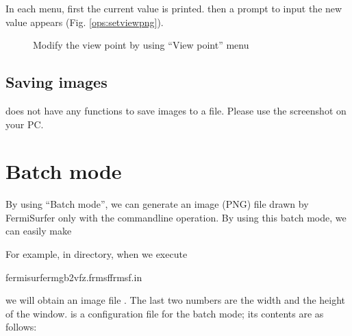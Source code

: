 \documentclass[letterpaper,10pt,pdftex,openany,english]{sphinxmanual}
\let\sphinxpxdimen\pdfpxdimen\else\newdimen\sphinxpxdimen
\begin{document}
\sphinxAtStartPar
In each menu, first the current value is printed. then a prompt to input
the new value appears (Fig. \ref{ops:setviewpng}).

\begin{figure}[htbp]
\centering
\capstart

\noindent\sphinxincludegraphics[width=300\sphinxpxdimen]{{setview}.png}
\caption{Modify the view point by using “View point” menu}\label{\detokenize{ops:id12}}\label{\detokenize{ops:setviewpng}}\end{figure}


\section{Saving images}
\label{\detokenize{ops:saving-images}}
\sphinxAtStartPar
{} does not have any functions to save images to a file.
Please use the screenshot on your PC.

\sphinxstepscope


\chapter{Batch mode}
\label{\detokenize{batch:batch-mode}}\label{\detokenize{batch::doc}}
\sphinxAtStartPar
By using “Batch mode”, we can generate an image (PNG) file drawn by FermiSurfer
only with the command\sphinxhyphen{}line operation.
By using this batch mode, we can easily make

\sphinxAtStartPar
For example, in  directory, when we execute

\begin{sphinxVerbatim}[commandchars=\\\{\}]
\PYGZdl{}fermisurfermgb2\PYGZus{}vfz.frmsffrmsf.in
\end{sphinxVerbatim}

\sphinxAtStartPar
we will obtain an image file .
The last two numbers are the width and the height of the window.
 is a configuration file for the batch mode;
its contents are as follows:
\end{document}
